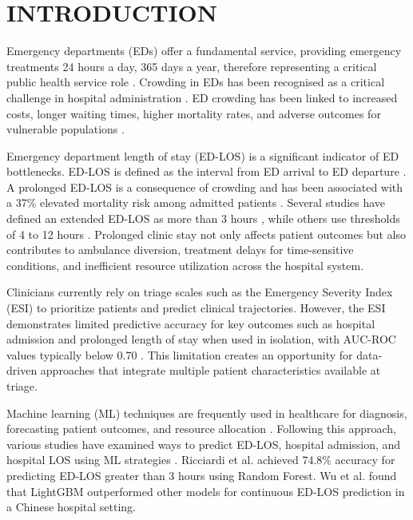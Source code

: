 \documentclass[harvard,article]{frontiersinFPHY_FAMS}
\begin{document}
\section{INTRODUCTION}

Emergency departments (EDs) offer a fundamental service, providing emergency treatments 24 hours a day, 365 days a year, therefore representing a critical public health service role \cite{higginson2012, trzeciak2003, ricciardi2024}. Crowding in EDs has been recognised as a critical challenge in hospital administration \cite{asplin2003, rcem2025}. ED crowding has been linked to increased costs, longer waiting times, higher mortality rates, and adverse outcomes for vulnerable populations \cite{sun2013, burke2020, obermeyer2019}.

Emergency department length of stay (ED-LOS) is a significant indicator of ED bottlenecks. ED-LOS is defined as the interval from ED arrival to ED departure \cite{stone2022, ricciardi2024}. A prolonged ED-LOS is a consequence of crowding and has been associated with a 37\% elevated mortality risk among admitted patients \cite{sun2013}. Several studies have defined an extended ED-LOS as more than 3 hours \cite{ricciardi2024}, while others use thresholds of 4 to 12 hours \cite{farimani2024}. Prolonged clinic stay not only affects patient outcomes but also contributes to ambulance diversion, treatment delays for time-sensitive conditions, and inefficient resource utilization across the hospital system.

Clinicians currently rely on triage scales such as the Emergency Severity Index (ESI) to prioritize patients and predict clinical trajectories. However, the ESI demonstrates limited predictive accuracy for key outcomes such as hospital admission and prolonged length of stay when used in isolation, with AUC-ROC values typically below 0.70 \cite{levin2020}. This limitation creates an opportunity for data-driven approaches that integrate multiple patient characteristics available at triage.

Machine learning (ML) techniques are frequently used in healthcare for diagnosis, forecasting patient outcomes, and resource allocation \cite{kareemi2020, raita2019}. Following this approach, various studies have examined ways to predict ED-LOS, hospital admission, and hospital LOS using ML strategies \cite{wu2025, fenn2021, lin2024}. Ricciardi et al. \cite{ricciardi2024} achieved 74.8\% accuracy for predicting ED-LOS greater than 3 hours using Random Forest. Wu et al. \cite{wu2025} found that LightGBM outperformed other models for continuous ED-LOS prediction in a Chinese hospital setting.
\end{document}

